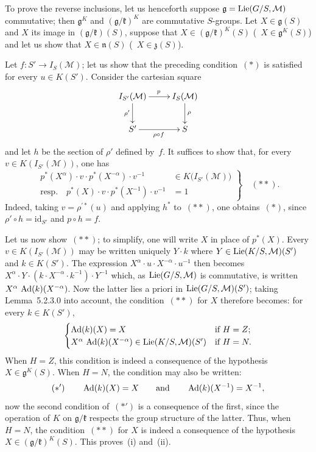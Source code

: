 To prove the reverse inclusions, let us henceforth suppose
\(\mathfrak{g}=\operatorname{Lie}(G/S,\mathcal{M})\) commutative; then \(\mathfrak{g}^{K}\) and
\((\mathfrak{g}/\mathfrak{k})^{K}\) are commutative \(S\)-groups. Let
\(X\in\mathfrak{g}(S)\) and \(X\) its image in
\((\mathfrak{g}/\mathfrak{k})(S)\), suppose that
\(X\in(\mathfrak{g}/\mathfrak{k})^{K}(S)\) (\resp~\(X\in\mathfrak{g}^{K}(S)\))
and let us show that \(X\in\mathfrak{n}(S)\)
(\resp~\(X\in\mathfrak{z}(S)\)).

Let \(f\colon S'\to I_S(\mathcal{M})\); let us show that the preceding
condition~\((*)\) is satisfied for every \(u\in K(S')\). Consider the
cartesian square
\[
\xymatrix{
I_{S'}(\mathcal{M}) \ar[r]^{p} \ar[d]_{\rho'}
  & I_S(\mathcal{M}) \ar[d]^{\rho} \\
S' \ar[r]_{\rho\circ f} & S
}
\]
and let \(h\) be the section of \(\rho'\) defined by~\(f\). It suffices to
show that, for every \(v\in K(I_{S'}(\mathcal{M}))\), one has
\[
\left.
\begin{aligned}
p^{*}(X^{\alpha})\cdot v\cdot p^{*}(X^{-\alpha})\cdot v^{-1}
  &\in K\bigl(I_{S'}(\mathcal{M})\bigr)\\
\text{resp.}\quad
p^{*}(X)\cdot v\cdot p^{*}(X^{-1})\cdot v^{-1}
  &=1
\end{aligned}
\right\}
\quad(**).
\]
Indeed, taking \(v=\rho^{\prime*}(u)\) and applying \(h^{*}\) to~\((**)\),
one obtains~\((*)\), since \(\rho'\circ h=\mathrm{id}_{S'}\) and
\(p\circ h=f\).

Let us now show~\((**)\); to simplify, one will write \(X\) in place of
\(p^{*}(X)\). Every \(v\in K(I_{S'}(\mathcal{M}))\) may be written uniquely
\(Y\cdot k\) where \(Y\in\operatorname{Lie}(K/S,\mathcal{M})(S')\) and \(k\in K(S')\).
The expression \(X^{\alpha}\cdot u\cdot X^{-\alpha}\cdot u^{-1}\) then
becomes \(X^{\alpha}\cdot Y\cdot(k\cdot X^{-\alpha}\cdot k^{-1})\cdot Y^{-1}\)
which, as \(\operatorname{Lie}(G/S,\mathcal{M})\) is commutative, is written
\(X^{\alpha}\,\operatorname{Ad}(k)(X^{-\alpha})\). Now the latter lies a priori in
\(\operatorname{Lie}(G/S,\mathcal{M})(S')\); taking Lemma~5.2.3.0 into account, the
condition~\((**)\) for \(X\) therefore becomes: for every
\(k\in K(S')\),
\[
\begin{cases}
\operatorname{Ad}(k)(X)=X
  & \text{if }H=Z;\\
X^{\alpha}\,\operatorname{Ad}(k)(X^{-\alpha})\in\operatorname{Lie}(K/S,\mathcal{M})(S')
  & \text{if }H=N.
\end{cases}
\]
When \(H=Z\), this condition is indeed a consequence of the hypothesis
\(X\in\mathfrak{g}^{K}(S)\).
When \(H=N\), the condition may also be written:
\[
(*')\qquad
\operatorname{Ad}(k)(X)=X
\qquad\text{and}\qquad
\operatorname{Ad}(k)(X^{-1})=X^{-1},
\]
now the second condition of~\((*')\) is a consequence of the first, since
the operation of \(K\) on \(\mathfrak{g}/\mathfrak{k}\) respects the group
structure of the latter. Thus, when \(H=N\), the condition~\((**)\) for
\(X\) is indeed a consequence of the hypothesis
\(X\in(\mathfrak{g}/\mathfrak{k})^{K}(S)\). This proves~(i) and~(ii).

